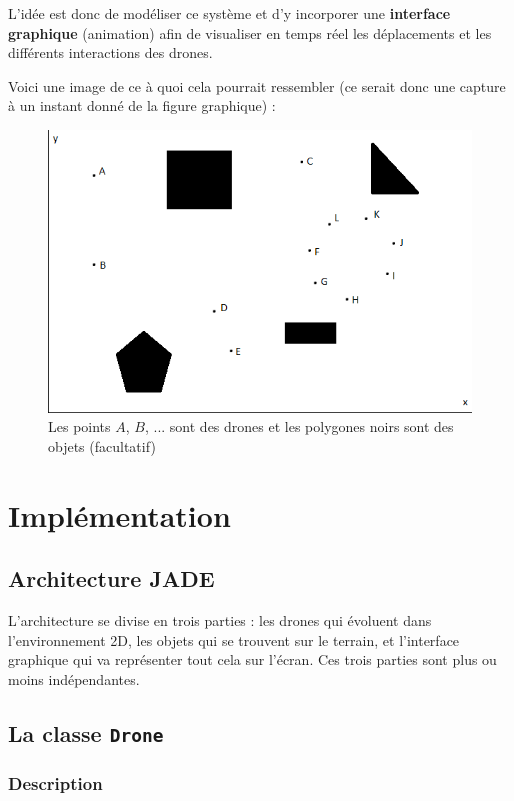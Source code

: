 \documentclass[11pt]{report}
\begin{document}
L'idée est donc de modéliser ce système et d'y incorporer une \textbf{interface graphique} (animation) afin de visualiser en temps réel les déplacements et les différents interactions des drones.

Voici une image de ce à quoi cela pourrait ressembler (ce serait donc une capture à un instant donné de la figure graphique) : 

\begin{figure}[h]
\centering
\includegraphics{img/drones-graphique.png}
\caption{Les points $A$, $B$, ... sont des drones et les polygones noirs sont des objets (facultatif)}
\end{figure}

\clearpage
\section{Implémentation}
\subsection{Architecture JADE}

L'architecture se divise en trois parties : les drones qui évoluent dans l'environnement 2D, les objets qui se trouvent sur le terrain, et l'interface graphique qui va représenter tout cela sur l'écran. Ces trois parties sont plus ou moins indépendantes.

\subsection{La classe \protect\Verb+Drone+}
\subsubsection{Description}
\end{document}
